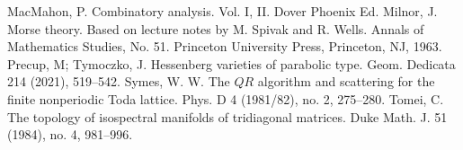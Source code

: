 \documentclass[reqno]{amsart}
\begin{document}
\begin{thebibliography}{}
 MacMahon, P. Combinatory analysis. Vol. I, II.
Dover Phoenix Ed.
 Milnor, J. Morse theory. Based on lecture notes by M. Spivak and R. Wells. Annals of Mathematics Studies, No. 51. Princeton University Press, Princeton, NJ, 1963.
 Precup, M; Tymoczko, J. Hessenberg varieties of parabolic type. Geom. Dedicata 214 (2021), 519--542.
 Symes, W. W. The $QR$ algorithm and scattering for the finite nonperiodic Toda lattice. Phys. D 4 (1981/82), no. 2, 275--280.
 Tomei, C. The topology of isospectral manifolds of tridiagonal matrices. Duke Math. J. 51 (1984), no. 4, 981--996.
\end{thebibliography}
\end{document}

